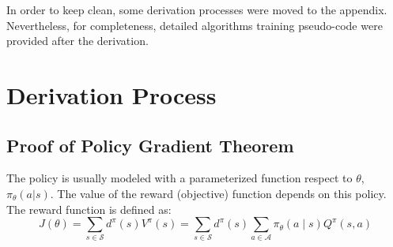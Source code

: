\begin{appendices}
In order to keep clean, some derivation processes were moved to the appendix. Nevertheless, for completeness, detailed algorithms training pseudo-code were provided after the derivation.
	\chapter{Derivation Process} \label{appendices-derivation-process}
	\section{Proof of Policy Gradient Theorem} \label{derivation-process-gradient-pg}
	The policy is usually modeled with a parameterized function respect to $\theta$, $\pi_{\theta}(a|s)$. The value of the reward (objective) function depends on this policy. The reward function is defined as:
	\begin{equation}
	J(\theta)=\sum_{s \in \mathcal{S}} d^{\pi}(s) V^{\pi}(s)=\sum_{s \in \mathcal{S}} d^{\pi}(s) \sum_{a \in \mathcal{A}} \pi_{\theta}(a \mid s) Q^{\pi}(s, a)
\end{equation}


\end{appendices}
